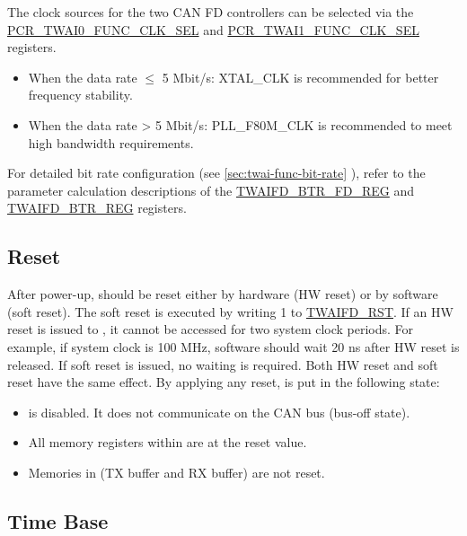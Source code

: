 \documentclass[main\_\_EN.tex]{subfiles}
\begin{document}
The clock sources for the two CAN FD controllers can be selected via the \hyperref[fielddesc:PCRTWAI0FUNCCLKSEL]{PCR\_TWAI0\_FUNC\_CLK\_SEL} and \hyperref[fielddesc:PCRTWAI1FUNCCLKSEL]{PCR\_TWAI1\_FUNC\_CLK\_SEL} registers.

\begin{itemize}
    \item When the data rate $\le$ 5 Mbit/s: XTAL\_CLK is recommended for better frequency stability.
    \item When the data rate > 5 Mbit/s: PLL\_F80M\_CLK is recommended to meet high bandwidth requirements.
\end{itemize}

For detailed bit rate configuration (see \ref{sec:twai-func-bit-rate} \textit{}), refer to the parameter calculation descriptions of the \hyperref[regdesc:TWAIFDBTRFDREG]{TWAIFD\_BTR\_FD\_REG} and \hyperref[regdesc:TWAIFDBTRREG]{TWAIFD\_BTR\_REG} registers.

\subsection{Reset}

After power-up, \modulename{} should be reset either by hardware (HW reset) or by software (soft reset). The soft reset is executed by writing 1 to \hyperref[fielddesc:TWAIFDRST]{TWAIFD\_RST}. If an HW reset is issued to \modulename{}, it cannot be accessed for two system clock periods. For example, if \modulename{} system clock is 100 MHz, software should wait 20 ns after HW reset is released. If soft reset is issued, no waiting is required. Both HW reset and soft reset have the same effect. By applying any reset, \modulename{} is put in the following state:

\begin{itemize}
    \item \modulename{} is disabled. It does not communicate on the CAN bus (bus-off state).
    \item All memory registers within \modulename{} are at the reset value.
    \item Memories in \modulename{} (TX buffer and RX buffer) are not reset.
\end{itemize}


\subsection{Time Base}
\label{sec:twai-func-time-base}
\end{document}
